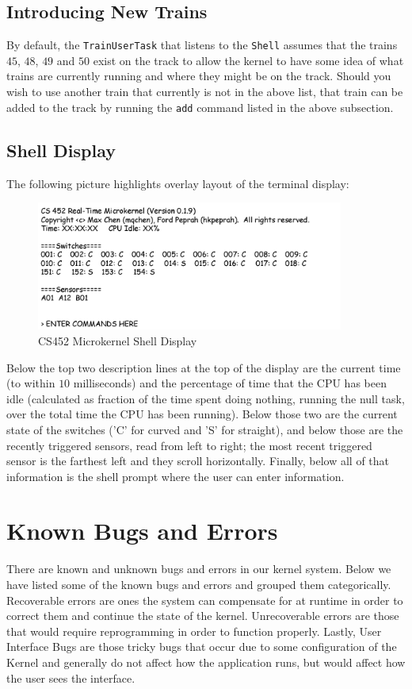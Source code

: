 \documentclass[12pt]{article}
\begin{document}
\subsection{Introducing New Trains}
By default, the {\tt TrainUserTask} that listens to the \texttt{Shell} assumes that the trains $45$, $48$, $49$ and $50$ exist on the track to allow the kernel to have some idea of what trains are currently running and where they might be on the track.  Should you wish to use another train that currently is not in the above list, that train can be added to the track by running the \texttt{add} command listed in the above subsection.
\\[1\baselineskip]
\subsection{Shell Display}
The following picture highlights overlay layout of the terminal display:
\begin{figure}[h!]
  \centering
  \includegraphics[width=0.9\textwidth]{shell.png}
  \caption{CS452 Microkernel Shell Display}
\end{figure}
Below the top two description lines at the top of the display are the current time (to within $10$ milliseconds) and the percentage of time that the CPU has been idle (calculated as fraction of the time spent doing nothing, running the null task, over the total time the CPU has been running).  Below those two are the current state of the switches ('C' for curved and 'S' for straight), and below those are the recently triggered sensors, read from left to right; the most recent triggered sensor is the farthest left and they scroll horizontally.  Finally, below all of that information is the shell prompt where the user can enter information.
\\[2\baselineskip]
\section{Known Bugs and Errors}
There are known and unknown bugs and errors in our kernel system.  Below we have listed some of the known bugs and errors and grouped them categorically.  Recoverable errors are ones the system can compensate for at runtime in order to correct them and continue the state of the kernel.  Unrecoverable errors are those that would require reprogramming in order to function properly.  Lastly, User Interface Bugs are those tricky bugs that occur due to some configuration of the Kernel and generally do not affect how the application runs, but would affect how the user sees the interface.
\end{document}
